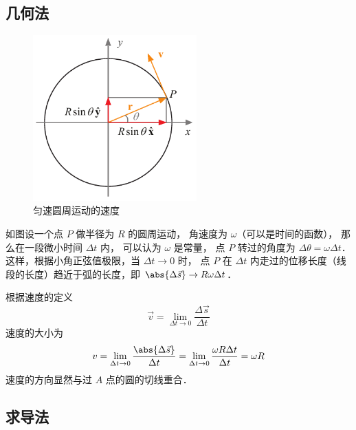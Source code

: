 
\subsection{几何法}

\begin{figure}[ht]
\centering
\includegraphics[width=6.3cm]{./figures/CMVD1.pdf}
\caption{匀速圆周运动的速度} \label{CMVD_fig1}
\end{figure}

如图设一个点 $P$ 做半径为 $R$ 的圆周运动， 角速度为 $\omega $（可以是时间的函数）， 那么在一段微小时间 $\Delta t$ 内， 可以认为 $\omega$ 是常量， 点 $P$ 转过的角度为 $\Delta \theta  = \omega \Delta t$． 这样，根据小角正弦值极限，当 $\Delta t \to 0$ 时， 点 $P$ 在 $\Delta t$ 内走过的位移长度（线段的长度）趋近于弧的长度，即 $\abs{\Delta \vec s} \to R\omega \Delta t$．  

根据速度的定义
\begin{equation}
\vec v = \lim_{\Delta t \to 0} \frac{\Delta \vec s}{\Delta t}
\end{equation}
速度的大小为
\begin{equation}
v = \lim_{\Delta t \to 0} \frac{\abs{\Delta \vec s}}{\Delta t} = \lim_{\Delta t \to 0} \frac{\omega R \Delta t}{\Delta t} = \omega R 
\end{equation}
速度的方向显然与过 $A$ 点的圆的切线重合．

\subsection{求导法}

